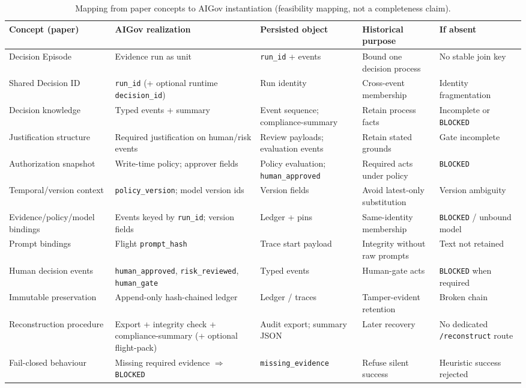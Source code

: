 \documentclass[11pt,a4paper]{article}
\begin{document}
\begin{table}[t]
\caption{Mapping from paper concepts to AIGov instantiation (feasibility mapping, not a completeness claim).}
\label{tab:aigov-map}
\centering
\scriptsize
\begin{tabularx}{\textwidth}{|X|X|X|X|X|}
\hline
Concept (paper) & AIGov realization & Persisted object & Historical purpose & If absent \\
\hline
Decision Episode & Evidence run as unit & \texttt{run\_id} + events & Bound one decision process & No stable join key \\
\hline
Shared Decision ID & \texttt{run\_id} (+ optional runtime \texttt{decision\_id}) & Run identity & Cross-event membership & Identity fragmentation \\
\hline
Decision knowledge & Typed events + summary & Event sequence; compliance-summary & Retain process facts & Incomplete or \texttt{BLOCKED} \\
\hline
Justification structure & Required justification on human/risk events & Review payloads; evaluation events & Retain stated grounds & Gate incomplete \\
\hline
Authorization snapshot & Write-time policy; approver fields & Policy evaluation; \texttt{human\_approved} & Required acts under policy & \texttt{BLOCKED} \\
\hline
Temporal/version context & \texttt{policy\_version}; model version ids & Version fields & Avoid latest-only substitution & Version ambiguity \\
\hline
Evidence/policy/model bindings & Events keyed by \texttt{run\_id}; version fields & Ledger + pins & Same-identity membership & \texttt{BLOCKED} / unbound model \\
\hline
Prompt bindings & Flight \texttt{prompt\_hash} & Trace start payload & Integrity without raw prompts & Text not retained \\
\hline
Human decision events & \texttt{human\_approved}, \texttt{risk\_reviewed}, \texttt{human\_gate} & Typed events & Human-gate acts & \texttt{BLOCKED} when required \\
\hline
Immutable preservation & Append-only hash-chained ledger & Ledger / traces & Tamper-evident retention & Broken chain \\
\hline
Reconstruction procedure & Export + integrity check + compliance-summary (+ optional flight-pack) & Audit export; summary JSON & Later recovery & No dedicated \texttt{/reconstruct} route \\
\hline
Fail-closed behaviour & Missing required evidence $\Rightarrow$ \texttt{BLOCKED} & \texttt{missing\_evidence} & Refuse silent success & Heuristic success rejected \\
\hline
\end{tabularx}
\end{table}
\end{document}
